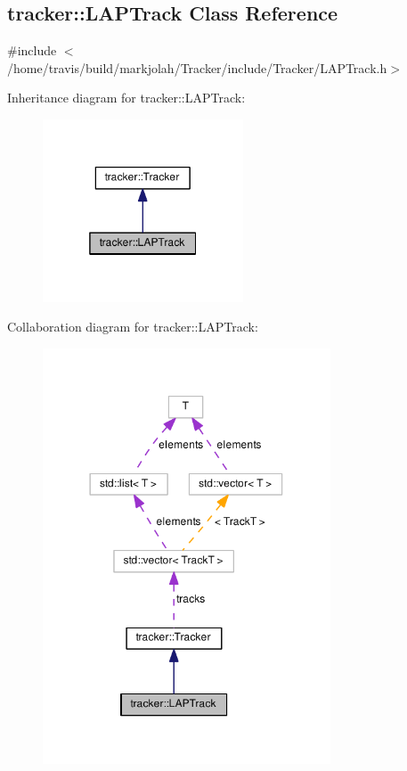 \hypertarget{classtracker_1_1LAPTrack}{}\subsection{tracker\+:\+:L\+A\+P\+Track Class Reference}
\label{classtracker_1_1LAPTrack}


{\ttfamily \#include $<$/home/travis/build/markjolah/\+Tracker/include/\+Tracker/\+L\+A\+P\+Track.\+h$>$}



Inheritance diagram for tracker\+:\+:L\+A\+P\+Track\+:\nopagebreak
\begin{figure}[H]
\begin{center}
\leavevmode
\includegraphics[width=169pt]{classtracker_1_1LAPTrack__inherit__graph}
\end{center}
\end{figure}


Collaboration diagram for tracker\+:\+:L\+A\+P\+Track\+:\nopagebreak
\begin{figure}[H]
\begin{center}
\leavevmode
\includegraphics[width=242pt]{classtracker_1_1LAPTrack__coll__graph}
\end{center}
\end{figure}
